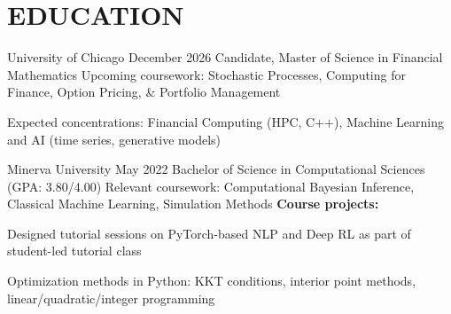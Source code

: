 \section{EDUCATION}
\begin{education_xp}[Chicago, IL]
                   {University of Chicago}
                   {December 2026}
                   {Candidate, Master of Science in Financial Mathematics}
    Upcoming coursework: Stochastic Processes, Computing for Finance, Option Pricing, \& Portfolio Management
    \begin{highlights}
        \item Expected concentrations: Financial Computing (HPC, C++), Machine Learning and AI (time series, generative models)
    \end{highlights}
\end{education_xp}
\vspace{0.1 cm}
\begin{education_xp}
                   {Minerva University}
                   {May 2022}
                   {Bachelor of Science in Computational Sciences (GPA: 3.80/4.00)}
    Relevant coursework: Computational Bayesian Inference, Classical Machine Learning, Simulation Methods\newline
    \textbf{Course projects:}
    \begin{highlights}
        \item Designed tutorial sessions on PyTorch-based NLP and Deep RL as part of student-led tutorial class
        \item Optimization methods in Python: KKT conditions, interior point methods, linear/quadratic/integer programming
    \end{highlights}
\end{education_xp}
